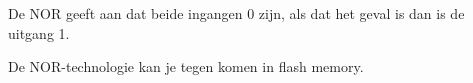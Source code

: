 De NOR geeft aan dat beide ingangen 0 zijn, als dat het geval is dan is de uitgang 1.

De NOR-technologie kan je tegen komen in flash memory.

